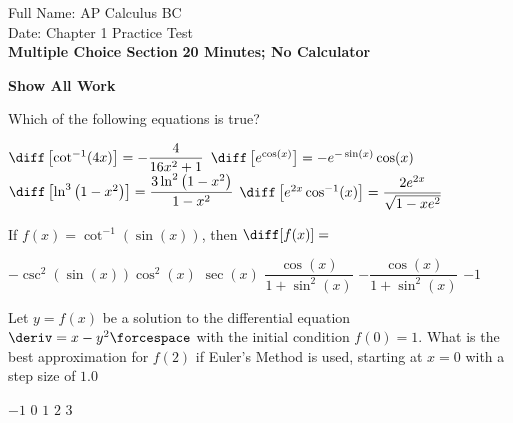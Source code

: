 \pagecolor{gray!10}%
Full Name: \hfill AP Calculus BC \\[22pt]
Date: \hfill Chapter 1 Practice Test \\[22pt]
\textbf{Multiple Choice Section} \hfill \textbf{20 Minutes; No Calculator} \\[11pt]

\begin{center}
    \textbf{Show All Work}
\end{center} \vspace{11pt}

\begin{questions}
    \question Which of the following equations is true? \\

    \begin{oneparchoices}
       \choice $\diff \left[\cot^{-1} (4x)\right] = -\dfrac{4}{16x^2 + 1}$
       \choice $\diff \left[e^{\cos (x)}\right] = -e^{-\sin (x)}\cos (x)$ 
       \vspace{11pt} \choice $\diff \left[\ln^3 \left(1 - x^2\right)\right] = \dfrac{3\ln^2 \left(1 - x^2\right)}{1 - x^2}$ 
       \choice $\diff \left[e^{2x}\cos^{-1} (x)\right] = \dfrac{2e^{2x}}{\sqrt{1 - xe^2}}$
    \end{oneparchoices} \par \horizontalline 

    \question If $f(x) = \cot^{-1} (\sin (x))$, then $\diff [f(x)] = $ \\

    \begin{oneparchoices}
        \choice $-\csc^2 (\sin (x)) \cos^2 (x)$
        \choice $\sec (x)$
        \choice $\dfrac{\cos (x)}{1 + \sin^2 (x)}$
        \choice $-\dfrac{\cos (x)}{1 + \sin^2 (x)}$
        \choice $-1$
    \end{oneparchoices} \par \horizontalline

    \question Let $y = f(x)$ be a solution to the differential equation $\deriv = x - y^2 \forcespace$ with the initial condition $f(0) = 1$. What is the best approximation for $f(2)$ if Euler's Method is used, starting at $x = 0$ with a step size of $1.0$ \\
    
    \begin{oneparchoices}
        \choice $-1$
        \choice $0$
        \choice $1$
        \choice $2$
        \choice $3$
    \end{oneparchoices} \par \horizontalline


\end{questions}
